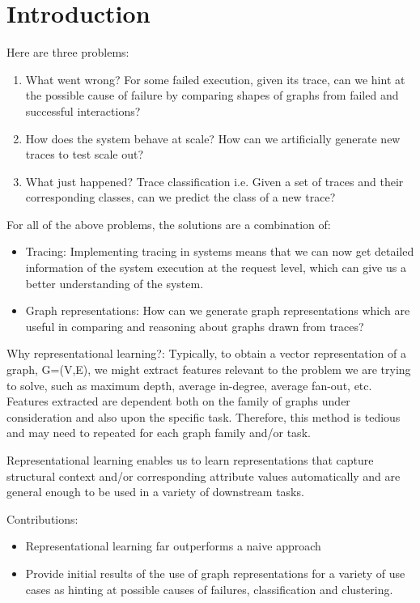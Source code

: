 \section{Introduction}
Here are three problems: 
\begin{enumerate}
\item What went wrong? For some failed execution, given its trace, can we hint at the possible cause of failure by comparing shapes of graphs from failed and successful interactions?
\item How does the system behave at scale? How can we artificially generate new traces to test scale out?
\item What just happened? Trace classification i.e. Given a set of traces and their corresponding classes, can we predict the class of a new trace? 
\end{enumerate}

For all of the above problems, the solutions are a combination of:
\begin{itemize}
\item Tracing: Implementing tracing in systems means that we can now get detailed information of the system execution at the request level, which can give us a better understanding of the system.
\item Graph representations: How can we generate graph representations which are useful in comparing and reasoning about graphs drawn from traces?
\end{itemize}

Why representational learning?: \newline
Typically, to obtain a vector representation of a graph, G=(V,E), we might extract features relevant to the problem we are trying to solve, such as maximum depth, average in-degree, average fan-out, etc. Features extracted are dependent both on the family of graphs under consideration and also upon the specific task. Therefore, this method is tedious and may need to repeated for each graph family and/or task.

Representational learning enables us to learn representations that capture structural context and/or corresponding attribute values automatically and are general enough to be used in a variety of downstream tasks. \newline

Contributions:
\begin{itemize}
\item Representational learning far outperforms a naive approach 
\item Provide initial results of the use of graph representations for a variety of use cases as hinting at possible causes of failures, classification and clustering.
\end{itemize}
